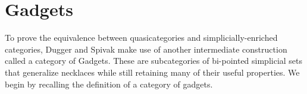 \documentclass{amsart}
\numberwithin{equation}{section}
\theoremstyle{plain}   %
\newtheorem{thm}[subsection]{Theorem}
\theoremstyle{remark}
\theoremstyle{plain}
\newcommand{\Nec}{\ensuremath{{\mathcal{N}ec}}}
\newcommand{\Hoc}{\ensuremath{{\mathcal{H}oc}}}
\newcommand{\overcat}[2]{{\left(#1\downarrow #2\right)}}
\DeclareMathOperator{\pt}{pt}
\begin{document}
\begin{comment}
	In the case of \(\mathfrak{C}^\Hoc\), we can see immediately that there is a unique natural transformation \[\mathcal{E}_{X,c}	(x,y)\to \pt,\] and this induces a map on homotopy colimits.  Moreover, since \(\mathcal{E}_{X,c}(x,y)(T)=\mathfrak{C}_\Delta	(\pi(T))(\alpha,\omega)\) and since \(\pi(T)\) is a simplicial necklace,  \(\mathfrak{C}_\Delta(\pi(T))(\alpha,\omega)\) is 	weakly contractible. Therefore, the induced map on homotopy-colimits is a weak equivalence of simplicial sets.  This shows 	that the natural map \[\mathfrak{C}^\Hoc \to \mathfrak{C}^\Nec\] is a weak equivalence.

	Then we need to show that \(E_{X,c}\) is a homotopy colimit:
	\begin{thm}\label{necthm}
		The natural map \[\mathfrak{C}^\Hoc_c \to \mathfrak{C}_c\] is a pointwise weak equivalence.
	\end{thm}
	\begin{proof}
		See \cite{ds1}*{4.4, 4.10, 5.2}.  Their proof works exactly the same way as in our case.  What they show is that the \	(\ell^\mathrm{th}\) row of the bisimplicial set of pairs 
		\[(\sigma:[n]\to \overcat{\Nec_c^\mathbf{sp}}{X_{x,y}}; \zeta \in \mathfrak{C}_\Delta(\pi\sigma(0))_\ell)\]
		is homotopy-discrete, which means that the homotopy and ordinary colimit agree.  Our indexing category is just a disjoint 	union of copies of their indexing category, so if theirs is homotopy-discrete, so is ours.
	\end{proof}
\end{comment}

\section{Gadgets}
To prove the equivalence between quasicategories and simplicially-enriched categories, Dugger and Spivak make use of another intermediate construction called a category of Gadgets.  These are subcategories of bi-pointed simplicial sets that generalize necklaces while still retaining many of their useful properties. We begin by recalling the definition of a category of gadgets.
\end{document}
